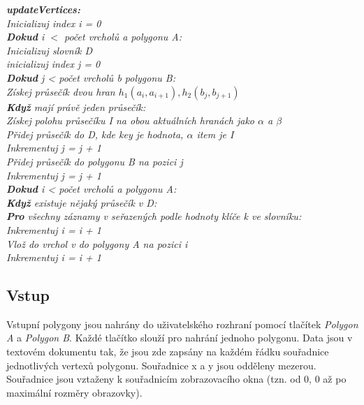 \documentclass{article}
\begin{document}
\indent\textit{\textbf{updateVertices:}}\\
\indent\textit{Inicializuj index i = 0}\\
\indent\textit{\textbf{Dokud} i $<$ počet vrcholů a polygonu A:}\\
\indent\indent\textit{Inicializuj slovník D}\\
\indent\indent\textit{inicializuj index j = 0}\\
\indent\indent\textit{\textbf{Dokud} j < počet vrcholů b polygonu B:}\\
\indent\indent\indent\textit{Získej průsečík dvou hran $h_{1}(a_{i},a_{i+1}),h_{2}(b_{j},b_{j+1})$}\\
\indent\indent\textit{\textbf{Když} mají právě jeden průsečík:}\\
\indent\indent\indent\textit{Získej polohu průsečíku I na obou aktuálních hranách jako $\alpha$ a $\beta$}\\
\indent\indent\indent\textit{Přidej průsečík do D, kde key je hodnota, $\alpha$ item je I}\\
\indent\indent\indent\textit{Inkrementuj j = j + 1}\\
\indent\indent\indent\textit{Přidej průsečík do polygonu B na pozici j}\\
\indent\indent\textit{Inkrementuj j = j + 1}\\
\indent\textit{\textbf{Dokud} i < počet vrcholů a polygonu A:}\\
\indent\textit{\textbf{Když} existuje nějaký průsečík v D:}\\
\indent\indent\textit{\textbf{Pro} všechny záznamy v seřazených podle hodnoty klíče k ve slovníku:}\\
\indent\indent\indent\textit{Inkrementuj i = i + 1}\\
\indent\indent\indent\textit{Vlož do vrchol v do polygony A na pozici i}\\
\indent\indent\textit{Inkrementuj i = i + 1}\\
\subsection{\small{Vstup}}
Vstupní polygony jsou nahrány do uživatelského rozhraní pomocí tlačítek \emph{Polygon A} a \emph{Polygon B}. Každé tlačítko slouží pro nahrání jednoho polygonu. Data jsou v textovém dokumentu tak, že jsou zde zapsány na každém řádku souřadnice jednotlivých vertexů polygonu. Souřadnice x a y jsou odděleny mezerou. Souřadnice jsou vztaženy k souřadnicím zobrazovacího okna (tzn. od 0, 0 až po maximální rozměry obrazovky).
\end{document}
